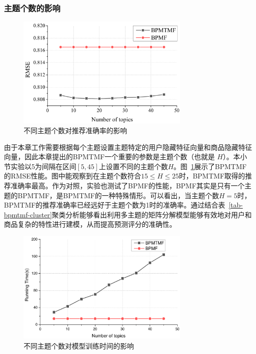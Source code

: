 \subsubsection{主题个数的影响}
\label{subsec-bpmtmf-sen} 
\begin{figure}
	\centering
	\includegraphics[width=0.75\textwidth]{Fig/bpmtmf/number}
	\caption{不同主题个数对推荐准确率的影响}
	\label{fig-bpmtmf-number}
\end{figure}
由于本章工作需要根据每个主题设置主题特定的用户隐藏特征向量和商品隐藏特征向量，因此本章提出的BPMTMF一个重要的参数是主题个数（也就是 $H$）。本小节实验以5为间隔在区间$[5,45]$上设置不同的主题个数$H$。图~\ref{fig-bpmtmf-number}展示了BPMTMF的RMSE性能。图中能观察到在主题个数符合$15\le H\le 25$时，BPMTMF取得的推荐准确率最高。作为对照，实验也测试了BPMF的性能，BPMF其实是只有一个主题的BPMTMF，是BPMTMF的一种特殊情形。可以看出，当主题个数$H=5$时，BPMTMF的推荐准确率已经远好于主题个数为1时的准确率。通过结合表~\ref{tab-bpmtmf-cluster}聚类分析能够看出利用多主题的矩阵分解模型能够有效地对用户和商品复杂的特性进行建模，从而提高预测评分的准确性。

\begin{figure}
	\centering
	\includegraphics[width=0.75\textwidth]{Fig/bpmtmf/ktime}
	\caption{不同主题个数对模型训练时间的影响}
	\label{fig-bpmtmf-time}
\end{figure}

